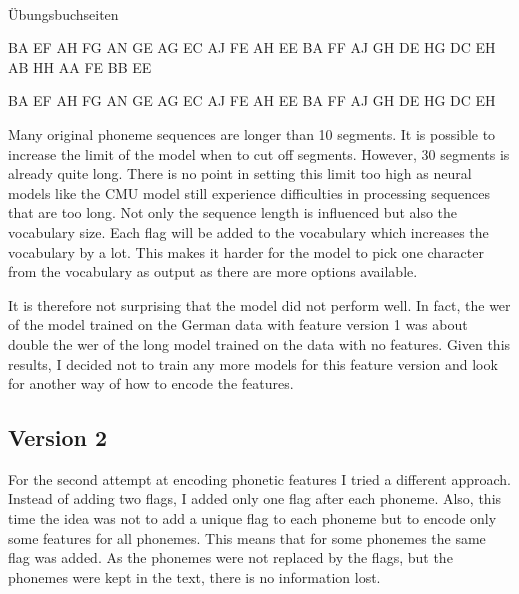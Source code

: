 \begin{covsubexamples}[preamble={The CMU model cuts off phoneme sequences that are longer than 30 segments. Sub-example (a) shows the original phoneme sequence without features and the corresponding grapheme sequence. Sub-example (b) shows the full length phoneme sequence with features and sub-example (c) shows the shortened version with features. It is easily understandable that there is a lot of information lost if a sequence is shortened like that.}]
\label{ex:cut-off}
\item \label{ex:cut-off1}  \\ Übungsbuchseiten
\item \label{ex:cut-off2}  BA EF  AH FG  AN GE  AG EC  AJ FE  AH EE  BA FF  AJ GH  DE HG  DC EH  AB HH  AA FE  BB EE
\item \label{ex:cut-off3}  BA EF  AH FG  AN GE  AG EC  AJ FE  AH EE  BA FF  AJ GH  DE HG  DC EH 
\end{covsubexamples}



Many original phoneme sequences are longer than 10 segments. It is possible to increase the limit of the model when to cut off segments. However, 30 segments is already quite long. There is no point in setting this limit too high as neural models like the CMU model still experience difficulties in processing sequences that are too long. Not only the sequence length is influenced but also the vocabulary size. Each flag will be added to the vocabulary which increases the vocabulary by a lot. This makes it harder for the model to pick one character from the vocabulary as output as there are more options available.  

It is therefore not surprising that the model did not perform well. In fact, the \ac{wer} of the model trained on the German data with feature version 1 was about double the \ac{wer} of the long model trained on the data with no features. Given this results, I decided not to train any more models for this feature version and look for another way of how to encode the features.

\subsection*{Version 2}
For the second attempt at encoding phonetic features I tried a different approach. Instead of adding two flags, I added only one flag after each phoneme. Also, this time the idea was not to add a unique flag to each phoneme but to encode only some features for all phonemes. This means that for some phonemes the same flag was added. As the phonemes were not replaced by the flags, but the phonemes were kept in the text, there is no information lost. 

